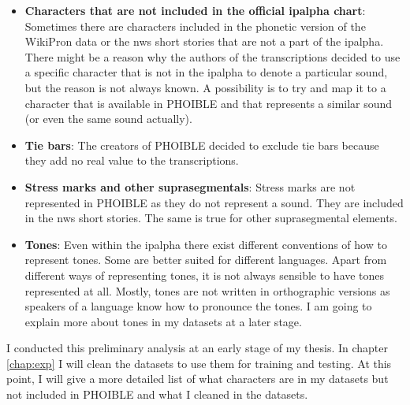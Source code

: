 \begin{itemize}
\item \textbf{Characters that are not included in the official \ac{ipalpha} chart}: Sometimes there are characters included in the phonetic version of the WikiPron data or the \ac{nws} short stories that are not a part of the \ac{ipalpha}. There might be a reason why the authors of the transcriptions decided to use a specific character that is not in the \ac{ipalpha} to denote a particular sound, but the reason is not always known. A possibility is to try and map it to a character that is available in PHOIBLE and that represents a similar sound (or even the same sound actually). 
\item \textbf{Tie bars}: The creators of PHOIBLE decided to exclude tie bars because they add no real value to the transcriptions.
\item \textbf{Stress marks and other suprasegmentals}: Stress marks are not represented in PHOIBLE as they do not represent a sound. They are included in the \ac{nws} short stories. The same is true for other suprasegmental elements.
\item \textbf{Tones}: Even within the \ac{ipalpha} there exist different conventions of how to represent tones. Some are better suited for different languages. Apart from different ways of representing tones, it is not always sensible to have tones represented at all. Mostly, tones are not written in orthographic versions as speakers of a language know how to pronounce the tones. I am going to explain more about tones in my datasets at a later stage.
\end{itemize}

I conducted this preliminary analysis at an early stage of my thesis. In chapter \ref{chap:exp} I will clean the datasets to use them for training and testing. At this point, I will give a more detailed list of what characters are in my datasets but not included in PHOIBLE and what I cleaned in the datasets.








